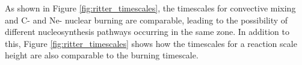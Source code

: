 As shown in Figure \ref{fig:ritter_timescales}, the timescales for convective mixing and C- and Ne- nuclear burning are comparable, leading to the possibility of different nucleosynthesis pathways occurring in the same zone.
In addition to this, Figure \ref{fig:ritter_timescales} shows how the timescales for a reaction scale height are also comparable to the burning timescale.